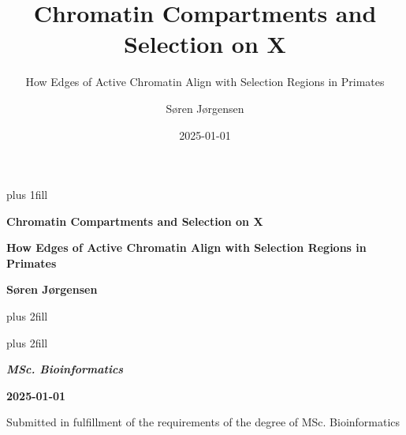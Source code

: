 \documentclass[
  11pt,
  a4paper,
]{scrbook}
\title{Chromatin Compartments and Selection on X}
\subtitle{How Edges of Active Chromatin Align with Selection Regions in
Primates}
\author{Søren Jørgensen}
\date{2025-01-01}
\begin{document}
\frontmatter
\cleardoublepage
\thispagestyle{empty}
{\centering
\hbox{}\vskip 0cm plus 1fill

{%
\Huge\bfseries Chromatin Compartments and Selection on X \par}
\vspace{3ex}
{\Large\bfseries How Edges of Active Chromatin Align with Selection
Regions in Primates \par}
\vspace{6ex}

    {\Large\bfseries Søren Jørgensen \par}
%
\vskip 0cm plus 2fill

{ \par}
\vskip 0cm plus 2fill

{\bfseries\Large\textit{MSc. Bioinformatics} \par}
\vspace{3ex}

{\bfseries\large 2025-01-01 \par}
\vspace{3ex}

\vspace{12ex}
{\small Submitted in fulfillment of the requirements
of the degree of MSc. Bioinformatics \par}
\pagebreak

}
\end{document}
